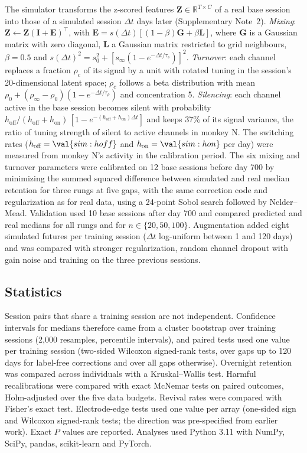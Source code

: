 \documentclass[pdflatex,sn-nature]{sn-jnl}
\begin{document}
The simulator transforms the z-scored features $\mathbf{Z} \in \mathbb{R}^{T\times C}$ of a real base session into those
of a simulated session $\Delta t$ days later (Supplementary Note~2). \textit{Mixing}: $\mathbf{Z} \leftarrow
\mathbf{Z}(\mathbf{I} + \mathbf{E})^\top$, with $\mathbf{E} = s(\Delta t)[(1 - \beta)\mathbf{G} + \beta\mathbf{L}]$, where
$\mathbf{G}$ is a Gaussian matrix with zero diagonal, $\mathbf{L}$ a Gaussian matrix restricted to grid neighbours,
$\beta = 0.5$ and $s(\Delta t)^2 = s_0^2 + [s_\infty(1 - e^{-\Delta t/\tau_s})]^2$. \textit{Turnover}: each channel
replaces a fraction $\rho_c$ of its signal by a unit with rotated tuning in the session's 20-dimensional latent space;
$\rho_c$ follows a beta distribution with mean $\rho_0 + (\rho_\infty - \rho_0)(1 - e^{-\Delta t/\tau_\rho})$ and
concentration 5. \textit{Silencing}: each channel active in the base session becomes silent with probability
$h_{\text{off}}/(h_{\text{off}} + h_{\text{on}})\,[1 - e^{-(h_{\text{off}} + h_{\text{on}})\Delta t}]$ and keeps 37\% of
its signal variance, the ratio of tuning strength of silent to active channels in monkey N. The switching rates
($h_{\text{off}} = \val{sim:hoff}$ and $h_{\text{on}} = \val{sim:hon}$ per day) were measured from monkey N's activity
in the calibration period. The six mixing and turnover parameters were calibrated on 12 base sessions before day 700 by
minimizing the summed squared difference between simulated and real median retention for three rungs at five gaps,
with the same correction code and regularization as for real data, using a 24-point Sobol search\cite{sobol1967}
followed by Nelder--Mead\cite{nelder1965}. Validation used 10 base sessions after day 700 and compared predicted and real
medians for all rungs and for $n \in \{20, 50, 100\}$. Augmentation added eight simulated futures per training session
($\Delta t$ log-uniform between 1 and 120 days) and was compared with stronger regularization, random channel dropout
with gain noise\cite{sussillo2016} and training on the three previous sessions.

\subsection*{Statistics}

Session pairs that share a training session are not independent. Confidence intervals for medians therefore came from a
cluster bootstrap over training sessions\cite{field2007} (2,000 resamples, percentile intervals), and paired tests used
one value per training session (two-sided Wilcoxon signed-rank tests, over gaps up to 120 days for label-free
corrections and over all gaps otherwise). Overnight retention was compared across individuals with a Kruskal--Wallis
test. Harmful recalibrations were compared with exact McNemar tests on paired outcomes, Holm-adjusted over the five data
budgets\cite{holm1979}. Revival rates were compared with Fisher's exact test. Electrode-edge tests used one value per
array (one-sided sign and Wilcoxon signed-rank tests; the direction was pre-specified from earlier work\cite{forrest2025}).
Exact $P$ values are reported. Analyses used Python 3.11 with NumPy, SciPy, pandas, scikit-learn and PyTorch.
\end{document}
